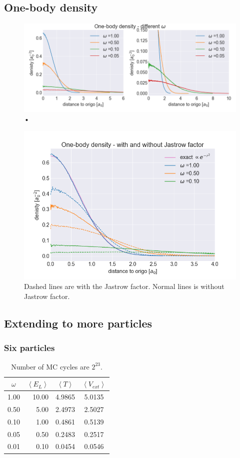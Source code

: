 \subsection{One-body density}

\begin{figure}[H]
\center
\includegraphics[width=0.85\linewidth]{../Results/one_body_density_no_interaction_2p}\caption{•}\label{fig:one_body_density_no_interaction_2p}
\end{figure}

\begin{figure}[H]
\center
\includegraphics[width=0.65\linewidth]{../Results/one_body_density_interaction_2p}\caption{Dashed lines are with the Jastrow factor. Normal lines is without Jastrow factor. }\label{fig:one_body_density_interaction_2p}
\end{figure}

\subsection{Extending to more particles}

\subsubsection{Six particles}

\begin{table}[H]\caption{Number of MC cycles are $2^{23}$. }\label{tab:ground_state_energy_importance_6p}
\center
\begin{tabular}{c|rcc}
$\omega$ & $\left< E_L \right>$  & $\left< T \right>$  & $\left< V_{ext}\right>$ \\ \hline
1.00 & 10.00 & 4.9865 & 5.0135\\ 
0.50 & 5.00 & 2.4973 & 2.5027\\
0.10 & 1.00 & 0.4861 & 0.5139\\
0.05 & 0.50 & 0.2483 & 0.2517\\
0.01 & 0.10 & 0.0454 & 0.0546\\
\end{tabular}
\end{table}

